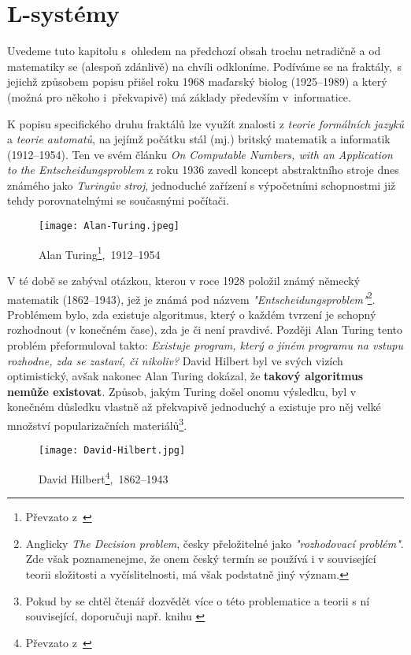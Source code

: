\section{L-systémy}\label{sec:L-systemy}

Uvedeme tuto kapitolu s~ohledem na předchozí obsah trochu netradičně a od matematiky se (alespoň zdánlivě) na chvíli odkloníme. Podíváme se na fraktály,~s jejichž způsobem popisu přišel roku 1968 maďarský biolog  (1925--1989) a který (možná pro někoho i~překvapivě) má základy především v~informatice. \citep[str. 2]{Prusinkiewicz1990}

K popisu specifického druhu fraktálů lze využít znalosti z \emph{teorie formálních jazyků} a \emph{teorie automatů}, na jejímž počátku stál (mj.) britský matematik a informatik  (1912--1954). Ten ve svém článku \emph{On Computable Numbers, with an Application to the Entscheidungsproblem} z roku 1936 zavedl koncept abstraktního stroje dnes známého jako \emph{Turingův stroj}, jednoduché zařízení s výpočetními schopnostmi již tehdy porovnatelnými se současnými počítači.
\begin{figure}[h]
    \centering
    \texttt{[image: Alan-Turing.jpeg]}
    \caption[Alan Turing,~1871--1956]{Alan Turing\footnote{Převzato z~\cite{OConnorTuring2025}},~1912--1954}
    \label{fig:alan-turing}
\end{figure}
V té době se zabýval otázkou, kterou v roce 1928 položil známý německý matematik  (1862--1943), jež je známá pod názvem \emph{"Entscheidungsproblem"}\footnote{Anglicky \emph{The Decision problem}, česky přeložitelné jako \emph{"rozhodovací problém"}. Zde však poznamenejme, že onem český termín se používá i v související teorii složitosti a vyčíslitelnosti, má však podstatně jiný význam.}. Problémem bylo, zda existuje algoritmus, který o každém tvrzení je schopný rozhodnout (v konečném čase), zda je či není pravdivé. Později Alan Turing tento problém přeformuloval takto: \emph{Existuje program, který o jiném programu na vstupu rozhodne, zda se zastaví, či nikoliv?} David Hilbert byl ve svých vizích optimistický, avšak nakonec Alan Turing dokázal, že \textbf{takový algoritmus nemůže existovat}. Způsob, jakým Turing došel onomu výsledku, byl v konečném důsledku vlastně až překvapivě jednoduchý a existuje pro něj velké množství popularizačních materiálů\footnote{Pokud by se chtěl čtenář dozvědět více o této problematice a teorii s ní související, doporučuji např. knihu \cite{Motwani2003}}.
\begin{figure}[h]
    \centering
    \texttt{[image: David-Hilbert.jpg]}
    \caption[David Hilbert,~1871--1956]{David Hilbert\footnote{Převzato z~\cite{OConnorHilbert2025}},~1862--1943}
    \label{fig:david-hilbert}
\end{figure}